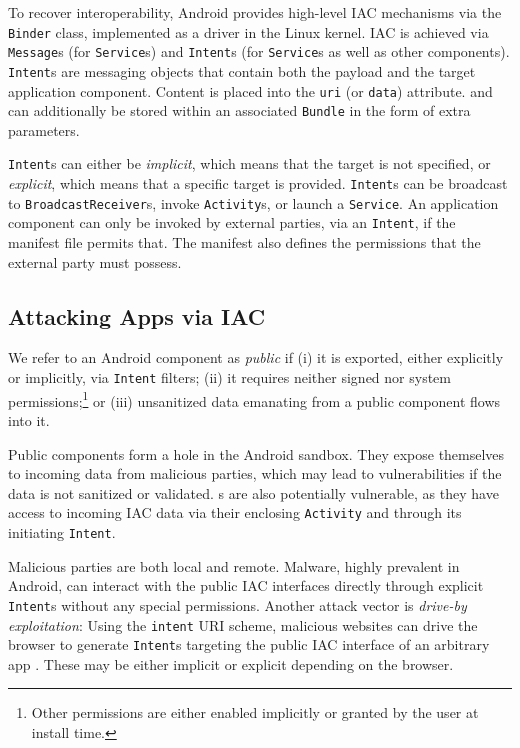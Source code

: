 To recover interoperability, Android provides high-level IAC mechanisms via the {\tt Binder} class, implemented as a driver in the Linux kernel. IAC is achieved via {\tt Message}s (for {\tt Service}s) and {\tt Intent}s (for {\tt Service}s as well as other components). {\tt Intent}s are messaging objects that contain both the payload and the target application component. Content is placed into the {\tt uri} (or {\tt data}) attribute. and can additionally be stored within an associated {\tt Bundle} in the form of extra parameters. 

{\tt Intent}s can either be \emph{implicit}, which means that the target is not specified, or \emph{explicit}, which means that a specific target is provided. 
%
{\tt Intent}s can be broadcast
to {\tt BroadcastReceiver}s, invoke {\tt Activity}s, or launch
a {\tt Service}. An application component can only be invoked by external parties, via an {\tt Intent}, if the manifest file permits that. The manifest also defines the permissions that the external party must possess.

\subsection{Attacking Apps via IAC}

We refer to an Android component as \emph{public} if (i) it is exported, either explicitly or implicitly, via {\tt Intent} filters; (ii) it requires neither signed nor system permissions;\footnote{
	Other permissions are either enabled implicitly or granted by the user at install time.
} or (iii) unsanitized data emanating from a public component flows into it.

Public components form a hole in the Android sandbox. They expose themselves to incoming data from malicious parties, which may lead to vulnerabilities if the data is not sanitized or validated. {\Frag}s are also potentially vulnerable, as they have access to incoming IAC data via their enclosing {\tt Activity} and through its initiating {\tt Intent}.

Malicious parties are both local and remote. Malware, highly prevalent in Android, can interact with the public IAC interfaces directly through explicit {\tt Intent}s without any special permissions. Another attack vector is \emph{drive-by exploitation}: Using the {\tt intent} URI scheme, malicious websites can drive the browser to generate {\tt Intent}s targeting the public IAC interface of an arbitrary app \cite{PHAB:ACSAC10,E:driveby}. These may be either implicit or explicit depending on the browser.

